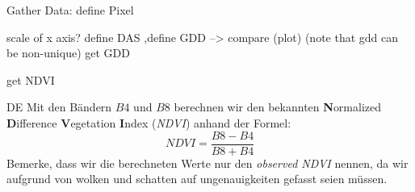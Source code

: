 	Gather Data:
	define Pixel

	scale of x axis?
	define DAS ,define GDD --> compare (plot)  (note that gdd can be non-unique)
	get GDD

	get NDVI

	DE
	Mit den  Bändern $B4$ und $B8$ berechnen wir den bekannten \textbf{N}ormalized \textbf{D}ifference \textbf{V}egetation \textbf{I}ndex (\textit{NDVI}) anhand der Formel:
	\begin{equation}
		NDVI = \frac{B8 - B4}{B8 + B4}
		\label{eq:ndvi}
	\end{equation}
	Bemerke, dass wir die berechneten Werte nur den \textit{observed NDVI} nennen, da wir aufgrund von wolken und schatten auf ungenauigkeiten gefasst seien müssen. 
